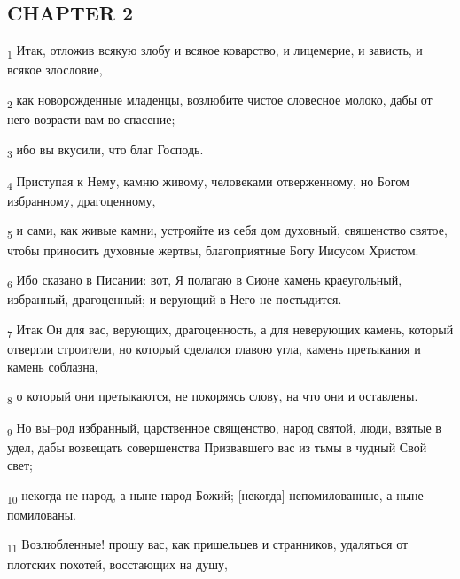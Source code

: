 \subsection{CHAPTER 2}
\begin{tcolorbox}
\textsubscript{1} Итак, отложив всякую злобу и всякое коварство, и лицемерие, и зависть, и всякое злословие,
\end{tcolorbox}
\begin{tcolorbox}
\textsubscript{2} как новорожденные младенцы, возлюбите чистое словесное молоко, дабы от него возрасти вам во спасение;
\end{tcolorbox}
\begin{tcolorbox}
\textsubscript{3} ибо вы вкусили, что благ Господь.
\end{tcolorbox}
\begin{tcolorbox}
\textsubscript{4} Приступая к Нему, камню живому, человеками отверженному, но Богом избранному, драгоценному,
\end{tcolorbox}
\begin{tcolorbox}
\textsubscript{5} и сами, как живые камни, устрояйте из себя дом духовный, священство святое, чтобы приносить духовные жертвы, благоприятные Богу Иисусом Христом.
\end{tcolorbox}
\begin{tcolorbox}
\textsubscript{6} Ибо сказано в Писании: вот, Я полагаю в Сионе камень краеугольный, избранный, драгоценный; и верующий в Него не постыдится.
\end{tcolorbox}
\begin{tcolorbox}
\textsubscript{7} Итак Он для вас, верующих, драгоценность, а для неверующих камень, который отвергли строители, но который сделался главою угла, камень претыкания и камень соблазна,
\end{tcolorbox}
\begin{tcolorbox}
\textsubscript{8} о который они претыкаются, не покоряясь слову, на что они и оставлены.
\end{tcolorbox}
\begin{tcolorbox}
\textsubscript{9} Но вы--род избранный, царственное священство, народ святой, люди, взятые в удел, дабы возвещать совершенства Призвавшего вас из тьмы в чудный Свой свет;
\end{tcolorbox}
\begin{tcolorbox}
\textsubscript{10} некогда не народ, а ныне народ Божий; [некогда] непомилованные, а ныне помилованы.
\end{tcolorbox}
\begin{tcolorbox}
\textsubscript{11} Возлюбленные! прошу вас, как пришельцев и странников, удаляться от плотских похотей, восстающих на душу,
\end{tcolorbox}
